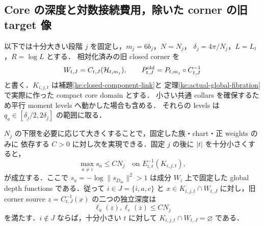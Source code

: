 \subsection{Core の深度と対数接続費用，除いた corner の旧 target 像}
\label{ke:core-target-caps-section}

以下では十分大きい段階 $j$ を固定し，$m_j=6b_j$，$N=N_j$，
$\delta_j=4\pi/N_j$，$L=L_t$，$R=\log L$ とする．
相対化済みの旧 closed corner を
\[
 W_{t,J}=C_{t,J}(\mathcal H_{t,m_j}),\qquad
 P^{\rm old}_{t,J}=P_{t,m_j}\circ C_{t,J}^{-1}
\]
と書く．$K_{i,j,t}$ は補題\ref{ke:closed-component-link}と
定理\ref{ke:actual-global-fibration}で実際に作った compact core domain とする．
小さい共通 collars を確保するため平行 moment levels へ動かした場合も含める．
それらの levels は $q_a\in[\delta_j/2,2\delta_j]$ の範囲に取る．

\begin{lemma}
\label{ke:core-depth-upper}
$N_j$ の下限を必要に応じて大きくすることで，固定した族・chart・正 weights のみに
依存する $C>0$ に対し次を実現できる．固定 $j$ の後に $|t|$ を十分小さくすると，
\[
 \max_{a\ne i}s_a\le C N_j
 \quad\text{on }E_{i,t}^{-1}(K_{i,j,t}),
\]
が成立する．ここで $s_a=-\log\|s_{D_{ia}}\|^2>1$ は成分 $W_i$ 上で固定した
global depth functions である．従って $i\in J=\{i,a,c\}$ と
$x\in K_{i,j,t}\cap W_{t,J}$ に対し，旧 corner source
$z=C_{t,J}^{-1}(x)$ の二つの独立深度は
\begin{equation}\label{ke:eq:removed-corner-depth-upper}
 \ell_a(z),\ell_c(z)\le C N_j
\end{equation}
を満たす．$i\notin J$ ならば，十分小さい $t$ に対して
$K_{i,j,t}\cap W_{t,J}=\varnothing$ である．
\end{lemma}

